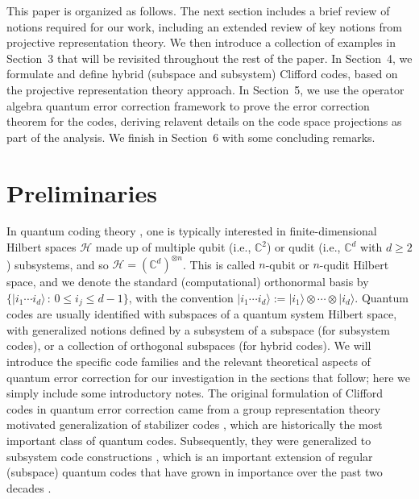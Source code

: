 \documentclass[11pt]{article}
\theoremstyle{definition}
\def\ket#1{| #1 \rangle}
\begin{document}
This paper is organized as follows. The next section includes a brief review of notions required for our work, including an extended review of key notions from projective representation theory. We then introduce a collection of examples in Section~3 that will be revisited throughout the rest of the paper. In Section~4, we formulate and define hybrid (subspace and subsystem) Clifford codes, based on the projective representation theory approach. In Section~5, we use the operator algebra quantum error correction framework to prove the error correction theorem for the codes, deriving relavent details on the code space projections as part of the analysis. We finish in Section~6 with some concluding remarks. 



\section{Preliminaries}\label{prelims}

In quantum coding theory \cite{knill1997theory,nielsen_chuang_2010,lidar2013quantum}, one is typically  interested in finite-dimensional Hilbert spaces $\mathcal H$ made up of multiple qubit (i.e., $\mathbb C^2$) or qudit (i.e., $\mathbb C^d$ with $d \geq 2$) subsystems, and so $\mathcal H = (\mathbb C^d)^{\otimes n}$. This is called $n$-qubit or $n$-qudit Hilbert space, and we denote the standard (computational) orthonormal basis by $\{ \ket{i_1 \cdots i_d} \, : \, 0 \leq i_j \leq d-1\}$, with the convention $\ket{i_1 \cdots i_d} := \ket{i_1} \otimes \cdots \otimes \ket{i_d}$. Quantum codes are usually identified with subspaces of a quantum system Hilbert space, with generalized notions defined by a subsystem of a subspace (for subsystem codes), or a collection of orthogonal subspaces (for hybrid codes). 
We will introduce the specific code families and the relevant theoretical aspects of quantum error correction for our investigation in the sections that follow; here we simply include some introductory notes. The original formulation of Clifford codes \cite{KnillI96,KnillII96,KlappeneckerRotteler02,KlappeneckerRottelerII02} in quantum error correction came from a group representation theory motivated generalization of stabilizer codes \cite{gottesman1996class,gottesman1997stabilizer}, which are historically the most important class of quantum codes. Subsequently, they were generalized to subsystem code constructions \cite{klappenecker2008clifford,klappenecker2010clifford}, which is an important extension of regular (subspace) quantum codes that have grown in importance over the past two decades \cite{bacon2006operator,Poulin2005Stabilizer,Kribs2005Unified}. 
\end{document}
